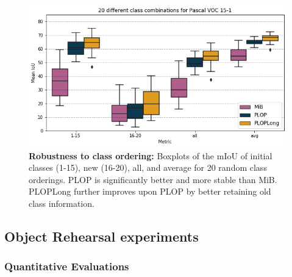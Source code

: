 \begin{figure}
    \centering
    \includegraphics[width=0.7\linewidth]{images/seg/order_voc_15-1.png}
    \vspace*{-0.3cm}
    \caption{\textbf{Robustness to class ordering:} Boxplots of the \ac{mIoU} of initial classes
        (1-15), new (16-20), all, and average for 20 random class orderings. PLOP is significantly
        better and more stable than MiB. PLOPLong further improves upon PLOP by better retaining old
        class information.}
    \label{fig:seg_order_voc_15-1}
\end{figure}


\subsection{Object Rehearsal experiments}

\subsubsection{Quantitative Evaluations}




